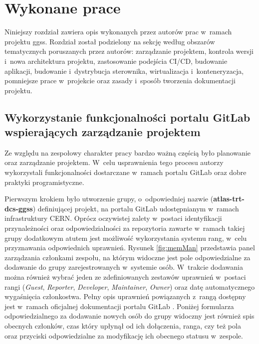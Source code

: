 
\chapter{Wykonane prace}
\label{cha:prace}

Niniejszy rozdział zawiera opis wykonanych przez autorów prac w~ramach projektu \gls*{ggss}. Rozdział został podzielony na sekcję według obszarów tematycznych poruszanych przez autorów: zarządzanie projektem, kontrola wersji i~nowa architektura projektu, zastosowanie podejścia CI/CD, budowanie aplikacji, budowanie i~dystrybucja sterownika, wirtualizacja i~konteneryzacja, pomniejsze prace w~projekcie oraz zasady i~sposób tworzenia dokumentacji projektu.

\section{Wykorzystanie funkcjonalności portalu GitLab wspierających zarządzanie projektem}

Ze względu na zespołowy charakter pracy bardzo ważną częścią było planowanie oraz zarządzanie projektem. W~celu usprawnienia tego procesu autorzy wykorzystali funkcjonalności dostarczane w~ramach portalu GitLab oraz dobre praktyki programistyczne.

Pierwszym krokiem było utworzenie grupy, o~odpowiedniej nazwie (\textbf{atlas-trt-dcs-ggss}) definiującej projekt, na portalu GitLab udostępnianym w~ramach infrastruktury CERN. Oprócz oczywistej zalety w~postaci identyfikacji przynależności oraz odpowiedzialności za repozytoria zawarte w~ramach takiej grupy dodatkowym atutem jest możliwość wykorzystania systemu rang, w~celu przyznawania odpowiednich uprawnień. Rysunek \ref{fig:memMan} przedstawia panel zarządzania członkami zespołu, na którym widoczne jest pole odpowiedzialne za dodawanie do grupy zarejestrowanych w~systemie osób. W~trakcie dodawania można również wybrać jeden ze zdefiniowanych zestawów uprawnień w~postaci rangi (\textit{Guest}, \textit{Reporter}, \textit{Developer}, \textit{Maintainer}, \textit{Owner}) oraz datę automatycznego wygaśnięcia członkostwa. Pełny opis uprawnień powiązanych z~rangą dostępny jest w~ramach oficjalnej dokumentacji portalu GitLab \cite{GitLabPermissions}. Poniżej formularza odpowiedzialnego za dodawanie nowych osób do grupy widoczny jest również spis obecnych członków, czas który upłynął od ich dołączenia, ranga, czy też pola oraz przyciski odpowiedzialne za modyfikację ich obecnego statusu w~zespole.

